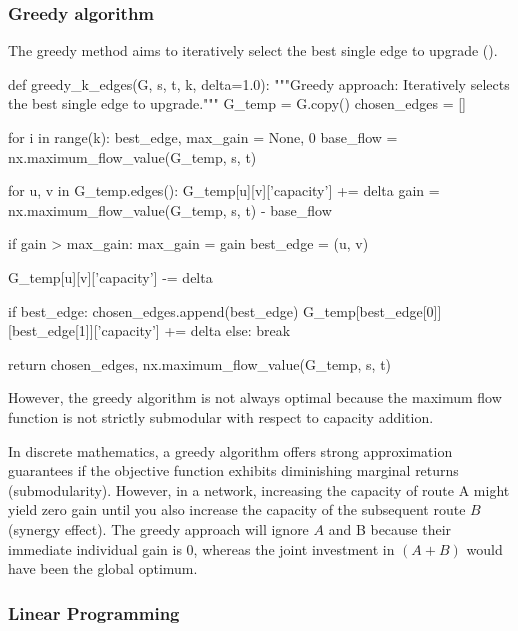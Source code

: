 \documentclass[12pt, openany]{article}
\begin{document}
\subsubsection{Greedy algorithm}

The greedy method aims to iteratively select the best single edge to upgrade ().

\begin{python}[caption={Python code for the greedy approach in order to identify the sequence of $k$ edges under budget constraint},  label={lst:3_greedy_method_lst}]
def greedy_k_edges(G, s, t, k, delta=1.0):
    """Greedy approach: Iteratively selects the best single edge to upgrade."""
    G_temp = G.copy()
    chosen_edges = []
    
    for i in range(k):
        best_edge, max_gain = None, 0
        base_flow = nx.maximum_flow_value(G_temp, s, t)
        
        for u, v in G_temp.edges():
            G_temp[u][v]['capacity'] += delta
            gain = nx.maximum_flow_value(G_temp, s, t) - base_flow
            
            if gain > max_gain:
                max_gain = gain
                best_edge = (u, v)
                
            G_temp[u][v]['capacity'] -= delta
            
        if best_edge:
            chosen_edges.append(best_edge)
            G_temp[best_edge[0]][best_edge[1]]['capacity'] += delta
        else:
            break
            
    return chosen_edges, nx.maximum_flow_value(G_temp, s, t)


\end{python}

However, the greedy algorithm is not always optimal because the maximum flow function is not strictly submodular with respect to capacity addition.

In discrete mathematics, a greedy algorithm offers strong approximation guarantees if the objective function exhibits diminishing marginal returns (submodularity). However, in a network, increasing the capacity of route A might yield zero gain until you also increase the capacity of the subsequent route $B$ (synergy effect). The greedy approach will ignore $A$ and B because their immediate individual gain is $0$, whereas the joint investment in $(A + B)$ would have been the global optimum.

\subsubsection{Linear Programming}
\end{document}

